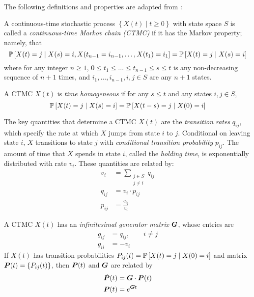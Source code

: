 The following definitions and properties are adapted from \citet{STAT455}:
\begin{defn}
A continuous-time stochastic process $\left\lbrace X(t) \; | \; t \geq 0 \right\rbrace$ with state space $S$ is called a \emph{continuous-time Markov chain (CTMC)} if it has the Markov property; namely, that 
\begin{equation}
\P \left[ X(t) = j \; | \; X(s) = i, X(t_{n-1} = i_{n-1}, \dots , X(t_1) = i_1 \right] = \P \left[ X(t) = j \; | \; X(s) = i \right]
\end{equation}
where for any integer $n \geq 1$, $0 \leq t_1 \leq \dots \leq t_{n-1} \leq s \leq t$ is any non-decreasing sequence of $n+1$ times, and $i_1,\dots,i_{n-1}, i, j \in S$ are any $n+1$ states.
\end{defn}
\begin{defn} A CTMC $X(t)$ is \emph{time homogeneous} if for any $s \leq t$ and any states $i,j \in S$,
\begin{equation}
\P \left[ X(t) = j \; | \; X(s) = i \right] = \P \left[ X(t-s) = j \; | \; X(0) = i \right]
\end{equation}
\end{defn}
\begin{defn}
The key quantities that determine a CTMC $X(t)$ are the \emph{transition rates} $q_{ij}$, which specify the rate at which $X$ jumps from state $i$ to $j$. Conditional on leaving state $i$, $X$ transitions to state $j$ with \emph{conditional transition probability} $p_{ij}$. The amount of time that $X$ spends in state $i$, called the \emph{holding time}, is exponentially distributed with rate $v_i$. These quantities are related by:
\begin{align}
v_i & = \sum_{\substack{j \in S \\ j \neq i}} q_{ij} \\
q_{ij} & = v_i \cdot p_{ij} \\
p_{ij} & = \frac{q_{ij}}{v_i}
\end{align} 
\end{defn}
\begin{defn}
A CTMC $X(t)$ has an \emph{infinitesimal generator matrix} $\mat{G}$, whose entries are
\begin{align}
g_{ij} &= q_{ij}, \qquad i \neq j \\
g_{ii} & = -v_i
\end{align}
If $X(t)$ has transition probabilities $P_{ij}(t) = \P \left[ X(t) = j \; | \; X(0) = i \right]$ and matrix $\mat{P}(t) = \lbrace P_{ij}(t) \rbrace$, then $\mat{P}(t)$ and $\mat{G}$ are related by
\begin{align}
\dot{\mat{P}}(t) & = \mat{G} \cdot \mat{P}(t) \\
\mat{P}(t)  &= e^{\mat{G}t} \label{eq:CTMCPG}
\end{align}
\end{defn}

